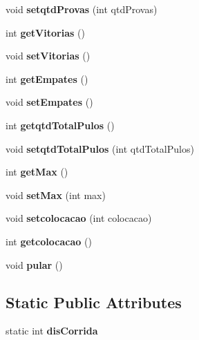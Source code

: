 \begin{DoxyCompactItemize}
\item 
\mbox{\label{classSapo_a8287731cab63f28dae2b87a158bec85f}} 
void {\bfseries setqtd\+Provas} (int qtd\+Provas)
\item 
\mbox{\label{classSapo_a102f82c22691765c15873d4ea667156e}} 
int {\bfseries get\+Vitorias} ()
\item 
\mbox{\label{classSapo_aff0d9d3e4811415933ee69354e71b8f3}} 
void {\bfseries set\+Vitorias} ()
\item 
\mbox{\label{classSapo_a24a527ff7ab06d1bde72a76fef41a17c}} 
int {\bfseries get\+Empates} ()
\item 
\mbox{\label{classSapo_a15f7d72a8fbf0bbafb6e0ba063ef3159}} 
void {\bfseries set\+Empates} ()
\item 
\mbox{\label{classSapo_ab1de2a106824cad4f2f128ccca5460b9}} 
int {\bfseries getqtd\+Total\+Pulos} ()
\item 
\mbox{\label{classSapo_a704ae195c37d87d5f550b20e82b531fe}} 
void {\bfseries setqtd\+Total\+Pulos} (int qtd\+Total\+Pulos)
\item 
\mbox{\label{classSapo_a424a97cd5ed99db8db2e410a164f5faa}} 
int {\bfseries get\+Max} ()
\item 
\mbox{\label{classSapo_a61176eb0322c6f35bff91d35a9295476}} 
void {\bfseries set\+Max} (int max)
\item 
\mbox{\label{classSapo_acacfb8225ee48e1825e72d51607f4709}} 
void {\bfseries setcolocacao} (int colocacao)
\item 
\mbox{\label{classSapo_ac72b8663d4b2ea18b8e6a9102f36d042}} 
int {\bfseries getcolocacao} ()
\item 
\mbox{\label{classSapo_a32e61c61677967120ae652099bd56805}} 
void {\bfseries pular} ()
\end{DoxyCompactItemize}
\subsection*{Static Public Attributes}
\begin{DoxyCompactItemize}
\item 
\mbox{\label{classSapo_a0fd5992889bd724888e892342cc978fe}} 
static int {\bfseries dis\+Corrida}
\end{DoxyCompactItemize}
